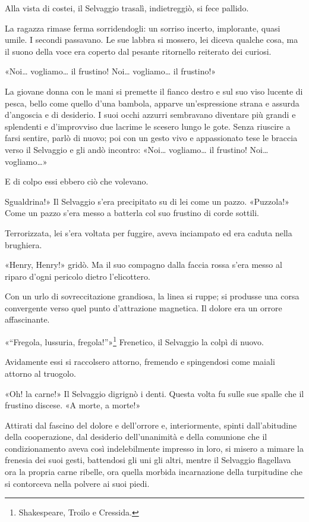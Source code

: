 \documentclass[
a5paper, %
10pt, %
twoside, 
onecolumn, %
openany, %
]{memoir}
\begin{document}
Alla vista di costei, il Selvaggio trasalì, indietreggiò, si fece pallido.

La ragazza rimase ferma sorridendogli: un sorriso incerto, implorante, quasi umile. I secondi passavano. Le sue labbra si mossero, lei diceva qualche cosa, ma il suono della voce era coperto dal pesante ritornello reiterato dei curiosi.

«Noi… vogliamo… il frustino! Noi… vogliamo… il frustino!»

La giovane donna con le mani si premette il fianco destro e sul suo viso lucente di pesca, bello come quello d’una bambola, apparve un’espressione strana e assurda d’angoscia e di desiderio. I suoi occhi azzurri sembravano diventare più grandi e splendenti e d’improvviso due lacrime le scesero lungo le gote. Senza riuscire a farsi sentire, parlò di nuovo; poi con un gesto vivo e appassionato tese le braccia verso il Selvaggio e gli andò incontro: «Noi… vogliamo… il frustino! Noi… vogliamo…»

E di colpo essi ebbero ciò che volevano.

Sgualdrina!» Il Selvaggio s’era precipitato su di lei come un pazzo. «Puzzola!» Come un pazzo s’era messo a batterla col suo frustino di corde sottili.

Terrorizzata, lei s’era voltata per fuggire, aveva inciampato ed era caduta nella brughiera.

«Henry, Henry!» gridò. Ma il suo compagno dalla faccia rossa s’era messo al riparo d’ogni pericolo dietro l’elicottero.

Con un urlo di sovreccitazione grandiosa, la linea si ruppe; si produsse una corsa convergente verso quel punto d’attrazione magnetica. Il dolore era un orrore affascinante.

«“Fregola, lussuria, fregola!”»\footnote{Shakespeare, Troilo e Cressida.} Frenetico, il Selvaggio la colpì di nuovo.

Avidamente essi si raccolsero attorno, fremendo e spingendosi come maiali attorno al truogolo.

«Oh! la carne!» Il Selvaggio digrignò i denti. Questa volta fu sulle sue spalle che il frustino discese. «A morte, a morte!»

Attirati dal fascino del dolore e dell’orrore e, interiormente, spinti dall’abitudine della cooperazione, dal desiderio dell’unanimità e della comunione che il condizionamento aveva così indelebilmente impresso in loro, si misero a mimare la frenesia dei suoi gesti, battendosi gli uni gli altri, mentre il Selvaggio flagellava ora la propria carne ribelle, ora quella morbida incarnazione della turpitudine che si contorceva nella polvere ai suoi piedi.
\end{document}
